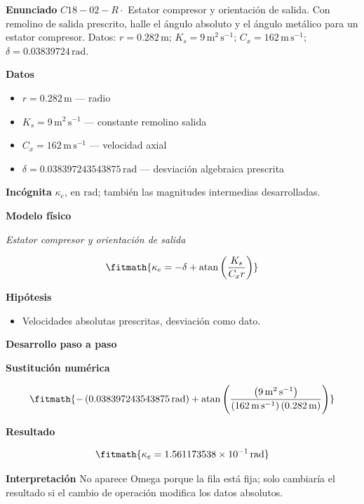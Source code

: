 \documentclass[10pt,openany]{book}
\begin{document}
\begin{tcolorbox}[title={Problema resuelto 2}, studiumworked, breakable]

\noindent\textbf{Enunciado}
\(C18-02-R \cdot\) Estator compresor y orientación de salida. Con remolino de salida prescrito, halle el ángulo absoluto y el ángulo metálico para un estator compresor. Datos: \(r=0.282\, \mathrm{m}\); \(K_s=9\, \mathrm{m}^{2}\,\mathrm{s}^{-1}\); \(C_x=162\, \mathrm{m}\,\mathrm{s}^{-1}\); \(\delta=0.03839724\, \mathrm{rad}\).

\noindent\textbf{Datos}
\begin{itemize}
\item $r = 0.282\,\mathrm{m}$ — radio
\item $K_s = 9\,\mathrm{m}^{2}\,\mathrm{s}^{-1}$ — constante remolino salida
\item $C_x = 162\,\mathrm{m}\,\mathrm{s}^{-1}$ — velocidad axial
\item $\delta = 0.038397243543875\,\mathrm{rad}$ — desviación algebraica prescrita
\end{itemize}

\noindent\textbf{Incógnita}
$\kappa_e$, en $\mathrm{rad}$; también las magnitudes intermedias desarrolladas.

\noindent\textbf{Modelo físico}

\noindent\textit{Estator compresor y orientación de salida}

\[
\fitmath{\kappa_e=- \delta + \operatorname{atan}{\left(\frac{K_s}{C_x r} \right)}}
\]

\noindent\textbf{Hipótesis}
\begin{itemize}
\item Velocidades absolutas prescritas, desviación como dato.
\end{itemize}

\noindent\textbf{Desarrollo paso a paso}



\noindent\textbf{Sustitución numérica}

\[
\fitmath{- \left(0.038397243543875\,\mathrm{rad}\right) + \operatorname{atan}{\left(\frac{\left(9\,\mathrm{m}^{2}\,\mathrm{s}^{-1}\right)}{\left(162\,\mathrm{m}\,\mathrm{s}^{-1}\right) \left(0.282\,\mathrm{m}\right)} \right)}}
\]

\noindent\textbf{Resultado}

\[
\fitmath{\kappa_e=1.561173538\times10^{-1}\,\mathrm{rad}}
\]

\noindent\textbf{Interpretación}
No aparece Omega porque la fila está fija; solo cambiaría el resultado si el cambio de operación modifica los datos absolutos.


\end{tcolorbox}
\end{document}
